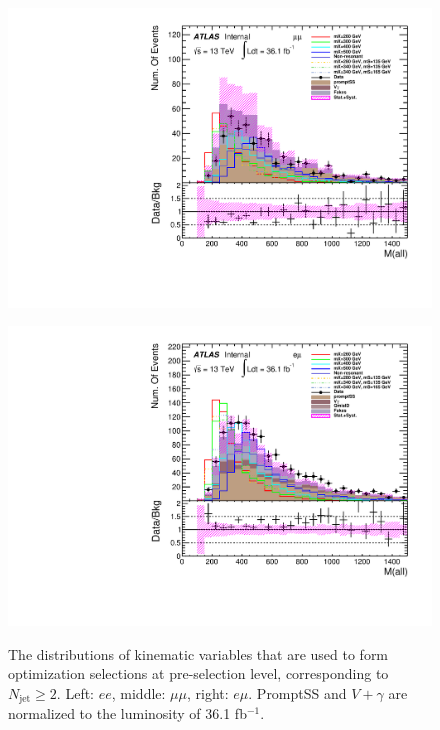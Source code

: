 \begin{figure}[h]
\begin{minipage}[t]{0.33\linewidth}
 \end{minipage}
  \begin{minipage}[t]{0.33\linewidth}
 \centering
 \includegraphics[width=1.0\textwidth]{fig/dataMC_low_Njet_CR/m_all_mumu.pdf}\label{fig:dataMC_low_Njet_CR:m_all_mumu.pdf}
 \end{minipage}
 \begin{minipage}[t]{0.33\linewidth}
 \centering
 \includegraphics[width=1.0\textwidth]{fig/dataMC_low_Njet_CR/m_all_emu.pdf}\label{fig:dataMC_low_Njet_CR:m_all_emu.pdf}
 \end{minipage}
 \caption{The distributions of kinematic variables that are used to form optimization selections at pre-selection level, corresponding to $N_{\text{jet}}\geq2$. Left: $ee$, middle: $\mu\mu$, right: $e\mu$. PromptSS and $V+\gamma$ are normalized to the luminosity of 36.1 fb$^{-1}$.}
\label{fig:SigOpt_low_kine}
\end{figure}

